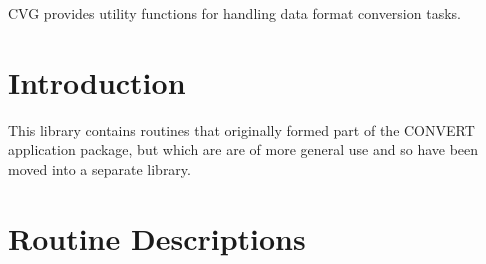 
CVG provides utility functions for handling data format conversion tasks.

 \newpage
 \begin{latexonly}
   \setlength{\parskip}{0mm}
   \latexonlytoc
   \setlength{\parskip}{\medskipamount}
   \markright{\stardocname}
 \end{latexonly}
\newpage
\renewcommand{\thepage}{\arabic{page}}
\setcounter{page}{1}

\section {Introduction}

This library contains routines that originally formed part of the CONVERT
application package, but which are are of more general use and so have
been moved into a separate library.

\appendix
\section{\label{APP:SPEC}Routine Descriptions}

